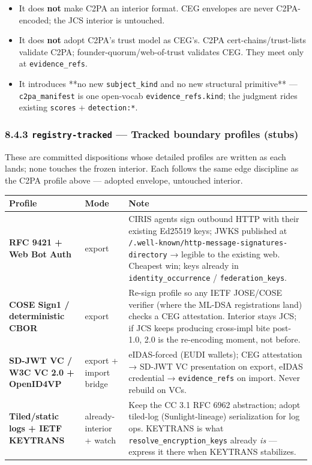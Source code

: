 \documentclass[11pt]{article}
\begin{document}
\begin{itemize}\setlength\itemsep{0pt}
\item It does \textbf{not} make C2PA an interior format. CEG envelopes are never C2PA-encoded; the JCS interior is untouched.
\item It does \textbf{not} adopt C2PA's trust model as CEG's. C2PA cert-chains/trust-lists validate C2PA; founder-quorum/web-of-trust validates CEG. They meet only at \texttt{evidence\_refs}.
\item It introduces **no new \texttt{subject\_kind} and no new structural primitive** — \texttt{c2pa\_manifest} is one open-vocab \texttt{evidence\_refs.kind}; the judgment rides existing \texttt{scores} + \texttt{detection:*}.
\end{itemize}


\subsubsection*{8.4.3 \texttt{registry-tracked} — Tracked boundary profiles (stubs)}


These are committed dispositions whose detailed profiles are written as each lands; none touches the frozen interior. Each follows the same edge discipline as the C2PA profile above — adopted envelope, untouched interior.


{\footnotesize
\begin{longtable}{|p{5.33cm}|p{5.33cm}|p{5.33cm}|}\hline
\textbf{Profile} & \textbf{Mode} & \textbf{Note} \\ \hline\endhead
\textbf{RFC 9421 + Web Bot Auth} & export & CIRIS agents sign outbound HTTP with their existing Ed25519 keys; JWKS published at \texttt{/.well-known/http-message-signatures-directory} → legible to the existing web. Cheapest win; keys already in \texttt{identity\_occurrence} / \texttt{federation\_keys}. \\ \hline
\textbf{COSE Sign1 / deterministic CBOR} & export & Re-sign profile so any IETF JOSE/COSE verifier (where the ML-DSA registrations land) checks a CEG attestation. Interior stays JCS; if JCS keeps producing cross-impl bite post-1.0, 2.0 is the re-encoding moment, not before. \\ \hline
\textbf{SD-JWT VC / W3C VC 2.0 + OpenID4VP} & export + import bridge & eIDAS-forced (EUDI wallets); CEG attestation → SD-JWT VC presentation on export, eIDAS credential → \texttt{evidence\_refs} on import. Never rebuild on VCs. \\ \hline
\textbf{Tiled/static logs + IETF KEYTRANS} & already-interior + watch & Keep the CC 3.1 RFC 6962 abstraction; adopt tiled-log (Sunlight-lineage) serialization for log ops. KEYTRANS is what \texttt{resolve\_encryption\_keys} already \textit{is} — express it there when KEYTRANS stabilizes. \\ \hline
\end{longtable}}
\end{document}
